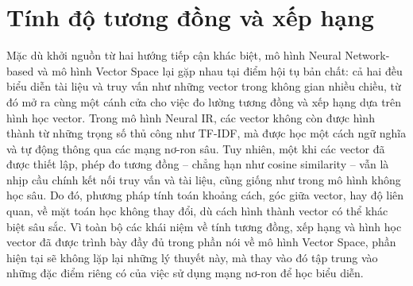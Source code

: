 \section{Tính độ tương đồng và xếp hạng}
Mặc dù khởi nguồn từ hai hướng tiếp cận khác biệt, mô hình Neural Network-based và mô hình Vector Space lại gặp nhau tại điểm hội tụ bản chất: cả hai đều biểu diễn tài liệu và truy vấn như những vector trong không gian nhiều chiều, từ đó mở ra cùng một cánh cửa cho việc đo lường tương đồng và xếp hạng dựa trên hình học vector. Trong mô hình Neural IR, các vector không còn được hình thành từ những trọng số thủ công như TF-IDF, mà được học một cách ngữ nghĩa và tự động thông qua các mạng nơ-ron sâu. Tuy nhiên, một khi các vector đã được thiết lập, phép đo tương đồng -- chẳng hạn như cosine similarity -- vẫn là nhịp cầu chính kết nối truy vấn và tài liệu, cũng giống như trong mô hình không học sâu. Do đó, phương pháp tính toán khoảng cách, góc giữa vector, hay độ liên quan, về mặt toán học không thay đổi, dù cách hình thành vector có thể khác biệt sâu sắc. Vì toàn bộ các khái niệm về tính tương đồng, xếp hạng và hình học vector đã được trình bày đầy đủ trong phần nói về mô hình Vector Space, phần hiện tại sẽ không lặp lại những lý thuyết này, mà thay vào đó tập trung vào những đặc điểm riêng có của việc sử dụng mạng nơ-ron để học biểu diễn.
